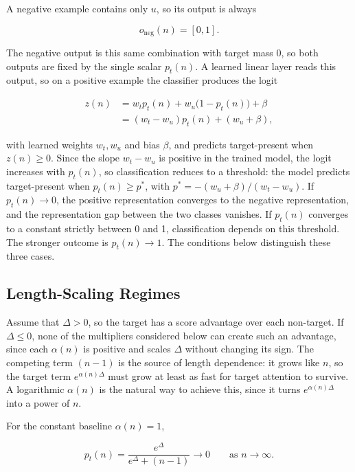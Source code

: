 \documentclass{article}
\begin{document}
A negative example contains only $u$, so its output is always

\begin{equation}
  o_{\text{neg}}(n)=[0,1].
  \label{eq:negative-output}
\end{equation}

The negative output is this same combination with target mass 0, so both
outputs are fixed by the single scalar $p_t(n)$. A learned linear layer reads
this output, so on a positive example the classifier produces the logit

\begin{align}
  z(n)
  &=w_t p_t(n)+w_u\bigl(1-p_t(n)\bigr)+\beta
  \nonumber\\
  &=(w_t-w_u)p_t(n)+(w_u+\beta),
  \label{eq:classifier-logit}
\end{align}

with learned weights $w_t,w_u$ and bias $\beta$, and predicts target-present
when $z(n)\geq0$. Since the slope $w_t-w_u$ is positive in the trained model,
the logit increases with $p_t(n)$, so classification reduces to a threshold:
the model predicts target-present when $p_t(n)\geq p^{\ast}$, with
$p^{\ast}=-(w_u+\beta)/(w_t-w_u)$. If $p_t(n)\to0$, the positive
representation converges to the negative representation, and the
representation gap between the two classes vanishes. If $p_t(n)$ converges to a
constant strictly between 0 and 1, classification depends on this threshold.
The stronger outcome is $p_t(n)\to1$. The conditions below
distinguish these three cases.

\subsection{Length-Scaling Regimes}
\label{sec:length-scaling-regimes}

Assume that $\Delta>0$, so the target has a score advantage over each
non-target. If $\Delta\leq0$, none of the multipliers considered below can
create such an advantage, since each $\alpha(n)$ is positive and scales
$\Delta$ without changing its sign. The competing term $(n-1)$ is the source
of length dependence: it grows like $n$, so the target term
$e^{\alpha(n)\Delta}$ must grow at least as fast for target attention to
survive. A logarithmic $\alpha(n)$ is the natural way to achieve this, since it
turns $e^{\alpha(n)\Delta}$ into a power of $n$.

For the constant baseline $\alpha(n)=1$,

\begin{equation}
  p_t(n)
  =
  \frac{e^\Delta}{e^\Delta+(n-1)}
  \longrightarrow 0
  \qquad\text{as }n\to\infty.
  \label{eq:constant-limit}
\end{equation}
\end{document}

